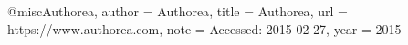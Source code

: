  @misc{Authorea,
      author = {Authorea},
      title = {Authorea},
      url = {https://www.authorea.com},
      note = {Accessed: 2015-02-27},
      year = 2015}